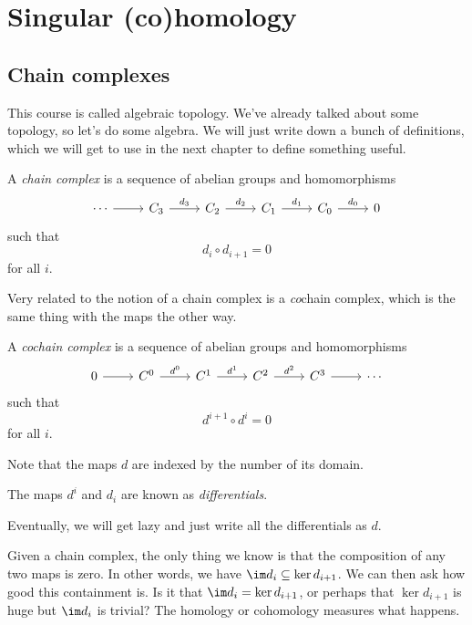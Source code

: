 \documentclass[a4paper]{article}
\begin{document}
\section{Singular (co)homology}
\subsection{Chain complexes}
This course is called algebraic topology. We've already talked about some topology, so let's do some algebra. We will just write down a bunch of definitions, which we will get to use in the next chapter to define something useful.

\begin{defi}
  A \emph{chain complex} is a sequence of abelian groups and homomorphisms
  \[
    \begin{tikzcd}
      \cdots \ar[r] & C_3 \ar[r, "d_3"] & C_2 \ar[r, "d_2"] & C_1 \ar[r, "d_1"] & C_0 \ar[r, "d_0"] & 0
    \end{tikzcd}
  \]
  such that
  \[
    d_i \circ d_{i + 1} = 0
  \]
  for all $i$.
\end{defi}

Very related to the notion of a chain complex is a \emph{co}chain complex, which is the same thing with the maps the other way.

\begin{defi}
  A \emph{cochain complex} is a sequence of abelian groups and homomorphisms
  \[
    \begin{tikzcd}
      0 \ar[r] & C^0 \ar[r, "d^0"] & C^1 \ar[r, "d^1"] & C^2 \ar[r, "d^2"] & C^3 \ar[r] & \cdots
    \end{tikzcd}
  \]
  such that
  \[
    d^{i + 1} \circ d^i = 0
  \]
  for all $i$.
\end{defi}

Note that the maps $d$ are indexed by the number of its domain.

\begin{defi}[Differentials]
  The maps $d^i$ and $d_i$ are known as \emph{differentials}.
\end{defi}
Eventually, we will get lazy and just write all the differentials as $d$.

Given a chain complex, the only thing we know is that the composition of any two maps is zero. In other words, we have $\im d_i \subseteq \ker d_{i + 1}$. We can then ask how good this containment is. Is it that $\im d_i = \ker d_{i + 1}$, or perhaps that $\ker d_{i + 1}$ is huge but $\im d_i$ is trivial? The homology or cohomology measures what happens.
\end{document}
